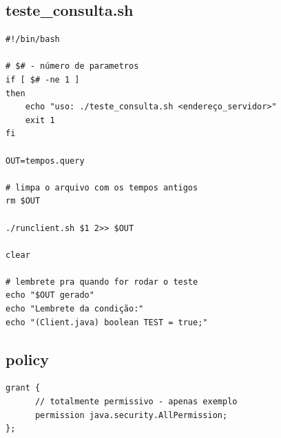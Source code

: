 \documentclass[11pt,twoside]{article}
\begin{document}
\subsection{teste\_consulta.sh}      %
\begin{verbatim}
#!/bin/bash

# $# - número de parametros 
if [ $# -ne 1 ]
then
    echo "uso: ./teste_consulta.sh <endereço_servidor>"
    exit 1
fi

OUT=tempos.query

# limpa o arquivo com os tempos antigos
rm $OUT

./runclient.sh $1 2>> $OUT

clear

# lembrete pra quando for rodar o teste
echo "$OUT gerado"
echo "Lembrete da condição:"
echo "(Client.java) boolean TEST = true;"

\end{verbatim}


\subsection{policy}       %
\begin{verbatim}
grant {
      // totalmente permissivo - apenas exemplo
      permission java.security.AllPermission;
};
\end{verbatim}


\end{document}
